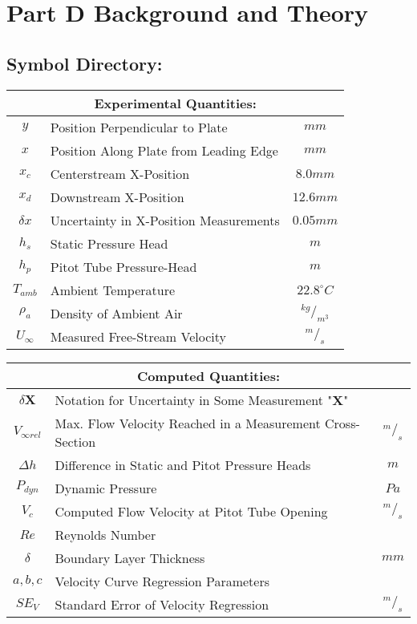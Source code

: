 \documentclass[12pt]{article}
\begin{document}
	\section{Part D Background and Theory}
	\hfill\break\break
	\subsection{Symbol Directory:}
	{
	\centering
	\begin{tabular}{|c|l|c|}
		\hline
		\multicolumn{3}{|c|}{\textbf{Experimental Quantities:}} \\
		\hline
		\hline
		$y$ & Position Perpendicular to Plate & $mm$ \\
		$x$ & Position Along Plate from Leading Edge & $mm$ \\
		$x_c$ & Centerstream X-Position & $8.0mm$ \\
		$x_d$ & Downstream X-Position & $12.6mm$ \\
		$\delta x$ & Uncertainty in X-Position Measurements & $0.05mm$ \\
		$h_s$ & Static Pressure Head & $m$\\
		$h_p$ & Pitot Tube Pressure-Head & $m$\\
		$T_{amb}$ & Ambient Temperature & $22.8^{\circ}C$\\
		$\rho_a$ & Density of Ambient Air & $^{kg}/_{m^3}$ \\
		$U_{\infty}$ & Measured Free-Stream Velocity & $^m/_s$ \\
		\hline
	\end{tabular}
	}
	\hfill\break\break\break
	{
	\centering
	\begin{tabular}{|c|l|c|}
		\hline
		\multicolumn{3}{|c|}{\textbf{Computed Quantities:}} \\
		\hline
		\hline
		$\delta \textbf{X}$ & Notation for Uncertainty in Some Measurement "\textbf{X}" & ${}$\\
		$V_{\infty rel}$ & Max. Flow Velocity Reached in a Measurement Cross-Section & $^m/_s$ \\
		$\Delta h$ & Difference in Static and Pitot Pressure Heads & $m$\\
		$P_{dyn}$ & Dynamic Pressure & $Pa$\\
		$V_c$ & Computed Flow Velocity at Pitot Tube Opening & $^m/_s$\\
		$Re$ & Reynolds Number & ${}$ \\
		$\delta$ & Boundary Layer Thickness & $mm$ \\
		$a,b,c$ & Velocity Curve Regression Parameters & ${}$ \\
		$SE_V$ & Standard Error of Velocity Regression & ${^m/_s}$ \\
		\hline
	\end{tabular}
	}
\end{document}
